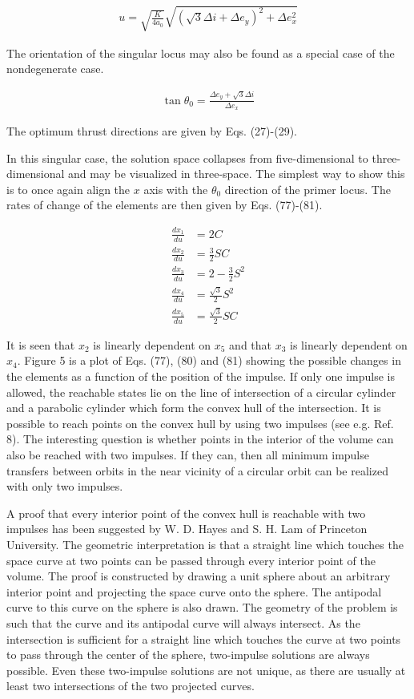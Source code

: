 \documentclass[12pt]{article}
\begin{document}
\begin{align}
u = \sqrt{\frac{K}{4a_0}} \sqrt{\left(\sqrt{3} \Delta i + \Delta e_y\right)^2 + \Delta e_x^2} \tag{75}
\end{align}

The orientation of the singular locus may also be found as a special case of the nondegenerate case.

\begin{align}
\tan \theta_0 = \frac{\Delta e_y + \sqrt{3} \Delta i}{\Delta e_x} \tag{76}
\end{align}

The optimum thrust directions are given by Eqs. (27)-(29).

In this singular case, the solution space collapses from five-dimensional to three-dimensional and may be visualized in three-space. The simplest way to show this is to once again align the $x$ axis with the $\theta_0$ direction of the primer locus. The rates of change of the elements are then given by Eqs. (77)-(81).

\begin{align}
\frac{dx_1}{du} &= 2C \tag{77} \\
\frac{dx_2}{du} &= \frac{3}{2} S C \tag{78} \\
\frac{dx_3}{du} &= 2 - \frac{3}{2} S^2 \tag{79} \\
\frac{dx_4}{du} &= \frac{\sqrt{3}}{2} S^2 \tag{80} \\
\frac{dx_5}{du} &= \frac{\sqrt{3}}{2} S C \tag{81}
\end{align}

It is seen that $ x_2 $ is linearly dependent on $ x_5 $ and that $ x_3 $ is linearly dependent on $ x_4 $. Figure 5 is a plot of Eqs. (77), (80) and (81) showing the possible changes in the elements as a function of the position of the impulse. If only one impulse is allowed, the reachable states lie on the line of intersection of a circular cylinder and a parabolic cylinder which form the convex hull of the intersection. It is possible to reach points on the convex hull by using two impulses (see e.g. Ref. 8). The interesting question is whether points in the interior of the volume can also be reached with two impulses. If they can, then all minimum impulse transfers between orbits in the near vicinity of a circular orbit can be realized with only two impulses.

A proof that every interior point of the convex hull is reachable with two impulses has been suggested by W. D. Hayes and S. H. Lam of Princeton University. The geometric interpretation is that a straight line which touches the space curve at two points can be passed through every interior point of the volume. The proof is constructed by drawing a unit sphere about an arbitrary interior point and projecting the space curve onto the sphere. The antipodal curve to this curve on the sphere is also drawn. The geometry of the problem is such that the curve and its antipodal curve will always intersect. As the intersection is sufficient for a straight line which touches the curve at two points to pass through the center of the sphere, two-impulse solutions are always possible. Even these two-impulse solutions are not unique, as there are usually at least two intersections of the two projected curves.
\end{document}
